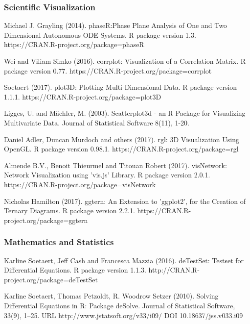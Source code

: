 \documentclass[preprint, 8pt]{elsarticle}
\theoremstyle{definition}
\begin{document}
\begin{thebibliography}{00}
\subsubsection{Scientific Visualization}

Michael J. Grayling (2014). 
\newblock phaseR:Phase Plane Analysis of One and Two Dimensional Autonomous ODE Systems. 
\newblock R package version 1.3. https://CRAN.R-project.org/package=phaseR

 Wei and Viliam Simko (2016).
\newblock corrplot: Visualization of a Correlation Matrix. 
\newblock R package version 0.77. https://CRAN.R-project.org/package=corrplot

 Soetaert (2017). 
\newblock plot3D: Plotting Multi-Dimensional Data. 
\newblock R package version 1.1.1. https://CRAN.R-project.org/package=plot3D

 Ligges, U. and Mächler, M. (2003).
\newblock Scatterplot3d - an R Package for Visualizing Multivariate Data.
\newblock Journal of Statistical Software 8(11), 1-20.

Daniel Adler, Duncan Murdoch and others (2017). 
\newblock rgl: 3D Visualization Using OpenGL. 
\newblock R package version 0.98.1. https://CRAN.R-project.org/package=rgl

 Almende B.V., Benoit Thieurmel and Titouan Robert (2017). visNetwork:
\newblock Network Visualization using 'vis.js' Library. R package version 2.0.1.
\newblock https://CRAN.R-project.org/package=visNetwork

 Nicholas Hamilton (2017). 
\newblock ggtern: An Extension to 'ggplot2', for the Creation of Ternary Diagrams. 
\newblock R package version 2.2.1. https://CRAN.R-project.org/package=ggtern

\subsubsection{Mathematics and Statistics}

 Karline Soetaert, Jeff Cash and Francesca Mazzia (2016). 
\newblock deTestSet: Testset for Differential Equations. R package version 1.1.3.
\newblock http://CRAN.R-project.org/package=deTestSet

Karline Soetaert, Thomas Petzoldt, R. Woodrow Setzer (2010). 
\newblock Solving Differential Equations in R: Package deSolve. 
\newblock Journal of Statistical Software, 33(9), 1--25. URL http://www.jstatsoft.org/v33/i09/ DOI 10.18637/jss.v033.i09


\end{thebibliography}
\end{document}
